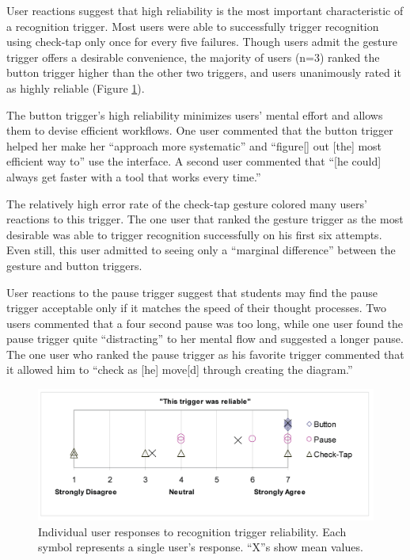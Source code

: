 \documentclass{egpubl}
\begin{document}

User reactions suggest that high reliability is the most important
characteristic of a recognition trigger.  Most users were able to 
successfully trigger recognition using check-tap only once
for every five failures. Though users admit the gesture trigger offers
a desirable convenience, the majority of users
(n=3) ranked the button trigger higher than the other two triggers,
and users unanimously rated it as highly reliable (Figure
\ref{fig:buttonReliabilityChart}).

The button trigger's high reliability minimizes users' mental effort
and allows them to devise efficient workflows.  One user commented
that the button trigger helped her make her ``approach more
systematic'' and ``figure[] out [the] most efficient way to'' use the
interface.  A second user commented that ``[he could] always get
faster with a tool that works every time.''

The relatively high error rate of the check-tap gesture colored many
users' reactions to this trigger.  The one user that ranked the
gesture trigger as the most desirable was able to trigger recognition
successfully on his first six attempts.  Even still, this user
admitted to seeing only a ``marginal difference'' between the gesture
and button triggers.

User reactions to the pause trigger suggest that students may
find the pause trigger acceptable only if it matches the speed of their
thought processes.  Two users commented that a four second pause was
too long, while one user found the pause trigger quite ``distracting''
to her mental flow and suggested a longer pause.  The one user who
ranked the pause trigger as his favorite trigger commented that it
allowed him to ``check as [he] move[d] through creating the diagram.''

\begin{figure}[tb]
  \centering
  \includegraphics[width=1.0\linewidth]{buttonReliable-bigger.png}
  \caption{\label{fig:buttonReliabilityChart} Individual user responses
           to recognition trigger reliability. Each symbol represents
           a single user's response.  ``X''s show mean values.}
\end{figure}
\end{document}
